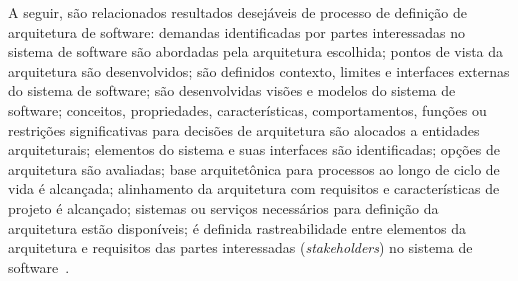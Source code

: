 A seguir, são relacionados resultados desejáveis de processo de definição de arquitetura de software: demandas identificadas por partes interessadas no sistema de software são abordadas pela arquitetura escolhida; pontos de vista da arquitetura são desenvolvidos; são definidos contexto, limites e interfaces externas do sistema de software; são desenvolvidas visões e modelos do sistema de software; conceitos, propriedades, características, comportamentos, funções ou restrições significativas para decisões de arquitetura são alocados a entidades arquiteturais; elementos do sistema e suas interfaces são identificadas; opções de arquitetura são avaliadas; base arquitetônica para processos ao longo de ciclo de vida é alcançada; alinhamento da arquitetura com requisitos e características de projeto é alcançado; sistemas ou serviços necessários para definição da arquitetura estão disponíveis; é definida rastreabilidade entre elementos da arquitetura e requisitos das partes interessadas (\emph{stakeholders}) no sistema de software~\cite{ISO_12207}. 

